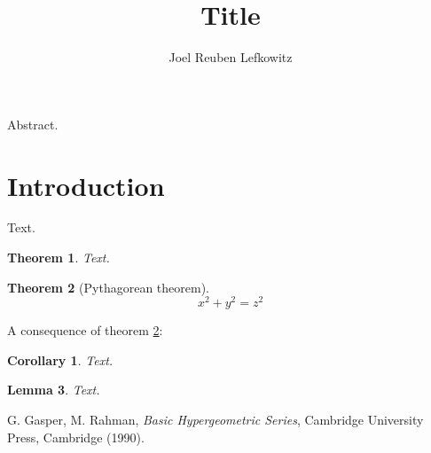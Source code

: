 \documentclass[12pt]{article}
\newtheorem{theorem}{Theorem}[section]
\newtheorem{corollary}{Corollary}[theorem]
\newtheorem{lemma}[theorem]{Lemma}
\renewenvironment{abstract}
 {\small
  \begin{center}
  \bfseries \abstractname\vspace{-.5em}\vspace{0pt}
  \end{center}
  \list{}{
    \setlength{\leftmargin}{.5cm}%
    \setlength{\rightmargin}{\leftmargin}%
  }%
  \item\relax}
 {\endlist}
\begin{document}
\title{Title}
\author{Joel Reuben Lefkowitz \\
  }
\maketitle

\begin{abstract}
  Abstract.
\end{abstract}
\section{Introduction}
Text.

\begin{theorem}
  Text.
\end{theorem}

\begin{theorem}[Pythagorean theorem]
  \label{pythagorean}
  \[ x^2 + y^2 = z^2 \]
\end{theorem}

A consequence of theorem \ref{pythagorean}:

\begin{corollary}
  Text.
\end{corollary}

\begin{lemma}
  Text.
\end{lemma}

\begin{thebibliography}{99}

   G. Gasper, M. Rahman, {\it Basic Hypergeometric Series}, Cambridge University Press, Cambridge (1990).

\end{thebibliography}
\end{document}
